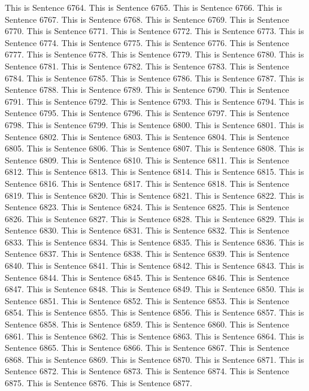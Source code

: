 \documentclass{article}
\begin{document}
This is Sentence 6764.
This is Sentence 6765.
This is Sentence 6766.
This is Sentence 6767.
This is Sentence 6768.
This is Sentence 6769.
This is Sentence 6770.
This is Sentence 6771.
This is Sentence 6772.
This is Sentence 6773.
This is Sentence 6774.
This is Sentence 6775.
This is Sentence 6776.
This is Sentence 6777.
This is Sentence 6778.
This is Sentence 6779.
This is Sentence 6780.
This is Sentence 6781.
This is Sentence 6782.
This is Sentence 6783.
This is Sentence 6784.
This is Sentence 6785.
This is Sentence 6786.
This is Sentence 6787.
This is Sentence 6788.
This is Sentence 6789.
This is Sentence 6790.
This is Sentence 6791.
This is Sentence 6792.
This is Sentence 6793.
This is Sentence 6794.
This is Sentence 6795.
This is Sentence 6796.
This is Sentence 6797.
This is Sentence 6798.
This is Sentence 6799.
This is Sentence 6800.
This is Sentence 6801.
This is Sentence 6802.
This is Sentence 6803.
This is Sentence 6804.
This is Sentence 6805.
This is Sentence 6806.
This is Sentence 6807.
This is Sentence 6808.
This is Sentence 6809.
This is Sentence 6810.
This is Sentence 6811.
This is Sentence 6812.
This is Sentence 6813.
This is Sentence 6814.
This is Sentence 6815.
This is Sentence 6816.
This is Sentence 6817.
This is Sentence 6818.
This is Sentence 6819.
This is Sentence 6820.
This is Sentence 6821.
This is Sentence 6822.
This is Sentence 6823.
This is Sentence 6824.
This is Sentence 6825.
This is Sentence 6826.
This is Sentence 6827.
This is Sentence 6828.
This is Sentence 6829.
This is Sentence 6830.
This is Sentence 6831.
This is Sentence 6832.
This is Sentence 6833.
This is Sentence 6834.
This is Sentence 6835.
This is Sentence 6836.
This is Sentence 6837.
This is Sentence 6838.
This is Sentence 6839.
This is Sentence 6840.
This is Sentence 6841.
This is Sentence 6842.
This is Sentence 6843.
This is Sentence 6844.
This is Sentence 6845.
This is Sentence 6846.
This is Sentence 6847.
This is Sentence 6848.
This is Sentence 6849.
This is Sentence 6850.
This is Sentence 6851.
This is Sentence 6852.
This is Sentence 6853.
This is Sentence 6854.
This is Sentence 6855.
This is Sentence 6856.
This is Sentence 6857.
This is Sentence 6858.
This is Sentence 6859.
This is Sentence 6860.
This is Sentence 6861.
This is Sentence 6862.
This is Sentence 6863.
This is Sentence 6864.
This is Sentence 6865.
This is Sentence 6866.
This is Sentence 6867.
This is Sentence 6868.
This is Sentence 6869.
This is Sentence 6870.
This is Sentence 6871.
This is Sentence 6872.
This is Sentence 6873.
This is Sentence 6874.
This is Sentence 6875.
This is Sentence 6876.
This is Sentence 6877.
\end{document}
